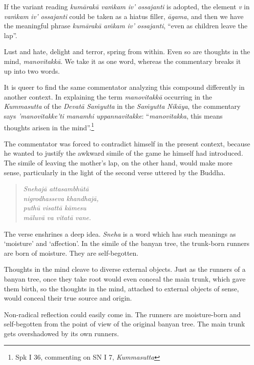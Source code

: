 If the variant reading \emph{kumārakā vaṁkam iv' ossajanti} is adopted, the element \emph{v} in \emph{vaṁkam iv' ossajanti} could be taken as a hiatus filler, \emph{āgama}, and then we have the meaningful phrase \emph{kumārakā aṁkam iv' ossajanti}, ``even as children leave the lap''.

Lust and hate, delight and terror, spring from within. Even so are thoughts in the mind, \emph{manovitakkā}. We take it as one word, whereas the commentary breaks it up into two words.

It is queer to find the same commentator analyzing this compound differently in another context. In explaining the term \emph{manovitakkā} occurring in the \emph{Kummasutta} of the \emph{Devatā Saṁyutta} in the \emph{Saṁyutta Nikāya}, the commentary says \emph{'manovitakke'ti manamhi uppannavitakke}: ``\emph{manovitakka}, this means thoughts arisen in the mind''.\footnote{Spk I 36, commenting on SN I 7, \emph{Kummasutta}}

The commentator was forced to contradict himself in the present context, because he wanted to justify the awkward simile of the game he himself had introduced. The simile of leaving the mother's lap, on the other hand, would make more sense, particularly in the light of the second verse uttered by the Buddha.

\clearpage

\begin{quote}
\emph{Snehajā attasambhūtā}\\
\emph{nigrodhasseva khandhajā,}\\
\emph{puthū visattā kāmesu}\\
\emph{māluvā va vitatā vane.}
\end{quote}

The verse enshrines a deep idea. \emph{Sneha} is a word which has such meanings as `moisture' and `affection'. In the simile of the banyan tree, the trunk-born runners are born of moisture. They are self-begotten.

Thoughts in the mind cleave to diverse external objects. Just as the runners of a banyan tree, once they take root would even conceal the main trunk, which gave them birth, so the thoughts in the mind, attached to external objects of sense, would conceal their true source and origin.

Non-radical reflection could easily come in. The runners are moisture-born and self-begotten from the point of view of the original banyan tree. The main trunk gets overshadowed by its own runners.

